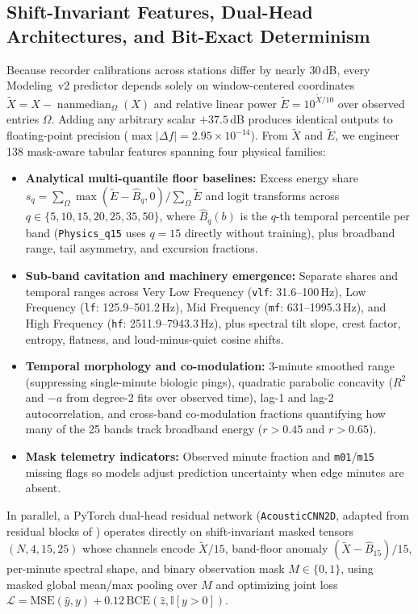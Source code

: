 \documentclass[10pt,a4paper]{article}
\begin{document}
\subsection{Shift-Invariant Features, Dual-Head Architectures, and Bit-Exact Determinism}
Because recorder calibrations across stations differ by nearly 30\,dB, every Modeling~v2 predictor depends solely on window-centered coordinates $\tilde{X} = X - \operatorname{nanmedian}_\Omega(X)$ and relative linear power $\tilde{E} = 10^{\tilde{X}/10}$ over observed entries $\Omega$. Adding any arbitrary scalar $+37.5$\,dB produces identical outputs to floating-point precision ($\max|\Delta f| = 2.95 \times 10^{-14}$). From $\tilde{X}$ and $\tilde{E}$, we engineer 138 mask-aware tabular features spanning four physical families:
\begin{itemize}
    \item \textbf{Analytical multi-quantile floor baselines:} Excess energy share $s_q = \sum_\Omega \max(\tilde{E} - \hat{B}_q, 0) / \sum_\Omega \tilde{E}$ and logit transforms across $q \in \{5,10,15,20,25,35,50\}$, where $\hat{B}_q(b)$ is the $q$-th temporal percentile per band (\texttt{Physics\_q15} uses $q=15$ directly without training), plus broadband range, tail asymmetry, and excursion fractions.
    \item \textbf{Sub-band cavitation and machinery emergence:} Separate shares and temporal ranges across Very Low Frequency (\texttt{vlf}: 31.6--100\,Hz), Low Frequency (\texttt{lf}: 125.9--501.2\,Hz), Mid Frequency (\texttt{mf}: 631--1995.3\,Hz), and High Frequency (\texttt{hf}: 2511.9--7943.3\,Hz), plus spectral tilt slope, crest factor, entropy, flatness, and loud-minus-quiet cosine shifts.
    \item \textbf{Temporal morphology and co-modulation:} 3-minute smoothed range (suppressing single-minute biologic pings), quadratic parabolic concavity ($R^2$ and $-a$ from degree-2 fits over observed time), lag-1 and lag-2 autocorrelation, and cross-band co-modulation fractions quantifying how many of the 25 bands track broadband energy ($r > 0.45$ and $r > 0.65$).
    \item \textbf{Mask telemetry indicators:} Observed minute fraction and \texttt{m01}/\texttt{m15} missing flags so models adjust prediction uncertainty when edge minutes are absent.
\end{itemize}
In parallel, a PyTorch dual-head residual network (\texttt{AcousticCNN2D}, adapted from residual blocks of \citealp{he2016resnet}) operates directly on shift-invariant masked tensors $(N, 4, 15, 25)$ whose channels encode $\tilde{X}/15$, band-floor anomaly $(\tilde{X} - \hat{B}_{15})/15$, per-minute spectral shape, and binary observation mask $M \in \{0,1\}$, using masked global mean/max pooling over $M$ and optimizing joint loss $\mathcal{L} = \mathrm{MSE}(\hat{y}, y) + 0.12\,\mathrm{BCE}(\hat{z}, \mathbb{I}[y>0])$.
\end{document}
